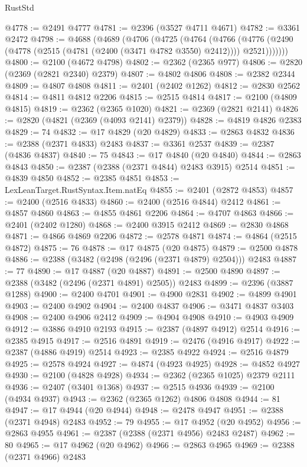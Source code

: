 \begin{lexlean}{RustStd}
\begin{coremodule}
{\begin{coremodule}
{{{{{{{{{{{{{{{{{{{{{{{{{{{{{{{{{{{{{{{{{{{{{{{{{{@4778 := @2491 @4777
@4781 := @2396 (@3527 @4711 @4671)
@4782 := @3361 @2472
@4798 := @4688
    (@4689
      (@4706
        (@4725
          (@4764
            (@4766
              (@4776 (@2490 (@4778 (@2515 (@4781 (@2400 (@3471 @4782 @3550) @2412)))) @2521)))))))
@4800 := @2100 (@4672 @4798)
@4802 := @2362 (@2365 @977)
@4806 := @2820 (@2369 (@2821 @2340) @2379)
@4807 := @4802 @4806
@4808 := @2382 @2344
@4809 := @4807 @4808
@4811 := @2401 (@2402 @1262)
@4812 := @2830 @2562
@4814 := @4811 @4812 @2206
@4815 := @2515 @4814
@4817 := @2100 (@4809 @4815)
@4819 := @2362 (@2365 @1020)
@4821 := @2369 (@2821 @2141)
@4826 := @2820 (@4821 (@2369 (@4093 @2141) @2379))
@4828 := @4819 @4826 @2383
@4829 := 74
@4832 := @17 @4829 (@20 @4829)
@4833 := @2863 @4832
@4836 := @2388 (@2371 @4833) @2483
@4837 := @3361 @2537
@4839 := @2387 (@4836 @4837)
@4840 := 75
@4843 := @17 @4840 (@20 @4840)
@4844 := @2863 @4843
@4850 := @2387 (@2388 (@2371 @4844) @2483 @3915) @2514
@4851 := @4839 @4850
@4852 := @2385 @4851
@4853 := LexLeanTarget.RustSyntax.Item.natEq
@4855 := @2401 (@2872 @4853)
@4857 := @2400 (@2516 @4833)
@4860 := @2400 (@2516 @4844) @2412
@4861 := @4857 @4860
@4863 := @4855 @4861 @2206
@4864 := @4707 @4863
@4866 := @2401 (@2402 @1280)
@4868 := @2400 @3915 @2412
@4869 := @2830 @4868
@4871 := @4866 @4869 @2206
@4872 := @2578 @4871
@4874 := @4864 (@2515 @4872)
@4875 := 76
@4878 := @17 @4875 (@20 @4875)
@4879 := @2500 @4878
@4886 := @2388 (@3482 (@2498 (@2496 (@2371 @4879) @2504))) @2483
@4887 := 77
@4890 := @17 @4887 (@20 @4887)
@4891 := @2500 @4890
@4897 := @2388 (@3482 (@2496 (@2371 @4891) @2505)) @2483
@4899 := @2396 (@3887 @1288)
@4900 := @2400 @4701
@4901 := @4900 @2831
@4902 := @4899 @4901
@4903 := @2400 @4902
@4904 := @2400 @4837
@4906 := @3471 @4837 @3403
@4908 := @2400 @4906 @2412
@4909 := @4904 @4908
@4910 := @4903 @4909
@4912 := @3886 @4910 @2193
@4915 := @2387 (@4897 @4912) @2514
@4916 := @2385 @4915
@4917 := @2516 @4891
@4919 := @2476 (@4916 @4917)
@4922 := @2387 (@4886 @4919) @2514
@4923 := @2385 @4922
@4924 := @2516 @4879
@4925 := @2578 @4924
@4927 := @4874 (@4923 @4925)
@4928 := @4852 @4927
@4930 := @2100 (@4828 @4928)
@4934 := @2362 (@2365 @1025) @2379 @2111
@4936 := @2407 (@3401 @1368)
@4937 := @2515 @4936
@4939 := @2100 (@4934 @4937)
@4943 := @2362 (@2365 @1262) @4806 @4808
@4944 := 81
@4947 := @17 @4944 (@20 @4944)
@4948 := @2478 @4947
@4951 := @2388 (@2371 @4948) @2483
@4952 := 79
@4955 := @17 @4952 (@20 @4952)
@4956 := @2863 @4955
@4961 := @2387 (@2388 (@2371 @4956) @2483 @2487)
@4962 := 80
@4965 := @17 @4962 (@20 @4962)
@4966 := @2863 @4965
@4969 := @2388 (@2371 @4966) @2483
}}}}}}}}}}}}}}}}}}}}}}}}}}}}}}}}}}}}}}}}}}}}}}}}}}
\end{coremodule}}
\end{coremodule}
\end{lexlean}
